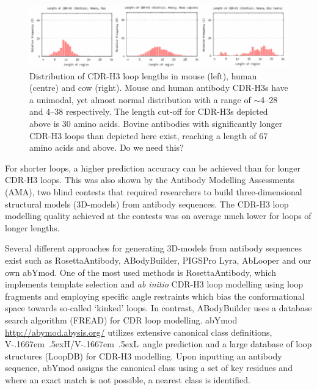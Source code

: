 \documentclass[12pt]{article}
\newcommand{\VH}{\mbox{V\kern-.1667em \lower.5ex\hbox{\scriptsize H}}}
\newcommand{\VL}{\mbox{V\kern-.1667em \lower.5ex\hbox{\scriptsize L}}}
\newcommand{\VHVL}{\mbox{\VH/\VL}}
\newcommand{\lilian}[1]{ {\color{red}{\bfseries Lilian:} #1}}
\begin{document}
\begin{figure}
  \centering
  \includegraphics[width=\linewidth]{loopdist.eps}
  \caption{Distribution of CDR-H3 loop lengths in mouse (left),
    human (centre) and cow (right). Mouse and human antibody CDR-H3s
    have a unimodal, yet almost normal distribution with a range of
    $\sim$4--28 and 4--38 respectively. The length cut-off for CDR-H3s
    depicted above is 30 amino acids. Bovine antibodies with
    significantly longer CDR-H3 loops than depicted here exist,
    reaching a length of 67 amino acids and
    above\protect\cite{Wong2015}. \lilian{Do we need this?}}  
  \label{fig:loopdist}
\end{figure}

For shorter loops, a higher prediction accuracy can be achieved than
for longer CDR-H3 loops. This was also shown by the Antibody Modelling
Assessments (AMA), two blind contests that required researchers to
build three-dimensional structural models (3D-models) from antibody sequences. The CDR-H3 loop
modelling quality achieved at the contests was on average much lower
for loops of longer lengths\cite{Almagro2011,Almagro2014}.

Several different approaches for generating 
3D-models from antibody sequences exist such as
RosettaAntibody\cite{Sircar2009,Sivasubramanian2009}, 
ABodyBuilder\cite{Leem2016}, PIGSPro\cite{Lepore2017} \lilian{Lyra, AbLooper} and our own abYmod.
One of the most
used methods is RosettaAntibody, which implements template selection
and \emph{ab initio} CDR-H3 loop modelling using loop fragments and employing
specific angle restraints which bias the conformational space towards
so-called `kinked' loops\cite{Schoeder2021,Weitzner2017}. In
contrast, ABodyBuilder uses a database search algorithm
(FREAD\cite{Choi2010}) for CDR loop modelling.
abYmod \url{http://abymod.abysis.org/} utilizes extensive canonical
class definitions, \VHVL\ angle prediction and a large database of loop
structures (LoopDB) for CDR-H3 modelling.
Upon inputting an antibody sequence, abYmod assigns the
canonical class using a set of key residues\cite{Martin1996} and where
an exact match is not possible, a nearest class is identified.
\end{document}
